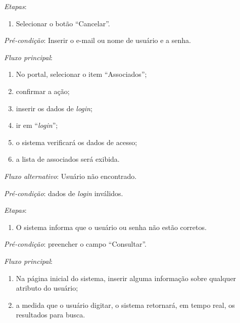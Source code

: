 \noindent \textit{Etapas}:

\begin{enumerate}
    \item Selecionar o botão ``Cancelar''.
\end{enumerate}



\vspace{0.7cm}

\noindent \textit{Pré-condição}: Inserir o e-mail ou nome de usuário e a senha.

\noindent \textit{Fluxo principal}:

\begin{enumerate}
    \item No portal, selecionar o item ``Associados'';
    \item confirmar a ação;
    \item inserir os dados de \textit{login};
    \item ir em ``\textit{login}'';
    \item o sistema verificará os dados de acesso;
    \item a lista de associados será exibida.
\end{enumerate}

\noindent \textit{Fluxo alternativo}: Usuário não encontrado.

\noindent \textit{Pré-condição}: dados de \textit{login} inválidos.

\noindent \textit{Etapas}:

\begin{enumerate}
    \item O sistema informa que o usuário ou senha não estão corretos.
\end{enumerate}



\vspace{0.7cm}

\noindent \textit{Pré-condição}: preencher o campo ``Consultar''.

\noindent \textit{Fluxo principal}:

\begin{enumerate}
    \item Na página inicial do sistema, inserir alguma informação sobre qualquer atributo do usuário;
    \item a medida que o usuário digitar, o sistema retornará, em tempo real, os resultados para busca.
\end{enumerate}


